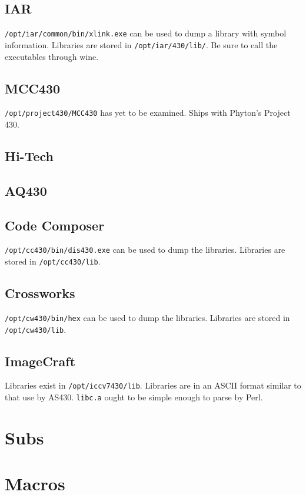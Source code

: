 \documentclass[]{book}
\begin{document}
\section{IAR}


{\tt /opt/iar/common/bin/xlink.exe} can be used to dump a library with symbol information.
Libraries are stored in {\tt /opt/iar/430/lib/}.  Be sure to call the
executables through wine.

\section{MCC430}


{\tt /opt/project430/MCC430} has yet to be examined.  Ships with Phyton's Project 430.

\section{Hi-Tech}


\section{AQ430}


\section{Code Composer}


{\tt /opt/cc430/bin/dis430.exe} can be used to dump the libraries.
Libraries are stored in {\tt /opt/cc430/lib}.

\section{Crossworks}


{\tt /opt/cw430/bin/hex} can be used to dump the libraries.
Libraries are stored in {\tt /opt/cw430/lib}.

\section{ImageCraft}


Libraries exist in {\tt /opt/iccv7430/lib}.  Libraries are in an ASCII format
similar to that use by AS430.  {\tt libc.a} ought to be simple enough to parse
by Perl.

\appendix

\chapter{Subs}
%

\chapter{Macros}
%

\printindex
\end{document}
